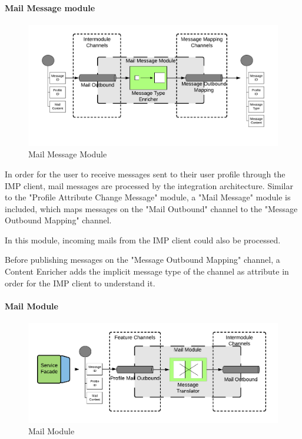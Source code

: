 \paragraph{Mail Message module}

\begin{figure}[H]
    \centering
    \includegraphics[scale=0.6]{Diagrams/Integration Architecture 1/Technological Integration/14. Mail Message Module.pdf}
    \caption{Mail Message Module}
    \label{integration1:mail_message_module}
\end{figure}

In order for the user to receive messages sent to their user profile through the IMP client, mail messages are processed by the integration architecture. Similar to the "Profile Attribute Change Message" module, a "Mail Message" module is included, which maps messages on the "Mail Outbound" channel to the "Message Outbound Mapping" channel.

In this module, incoming mails from the IMP client could also be processed.

Before publishing messages on the "Message Outbound Mapping" channel, a Content Enricher adds the implicit message type of the channel as attribute in order for the IMP client to understand it. 

\paragraph{Mail Module}

\begin{figure}[H]
    \centering
    \includegraphics[scale=0.6]{Diagrams/Integration Architecture 1/Technological Integration/15. Mail Module.pdf}
    \caption{Mail Module}
    \label{integration1:mail_module}
\end{figure}


